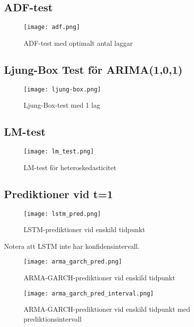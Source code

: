 \documentclass[11pt]{article}
\numberwithin{equation}{section}
\numberwithin{table}{section}
\numberwithin{figure}{section}
\begin{document}
\subsection{ADF-test}
\begin{figure}[H]
\caption{ADF-test med optimalt antal laggar}
\texttt{[image: adf.png]}
\centering
\end{figure}

\subsection{Ljung-Box Test för ARIMA(1,0,1)}
\begin{figure}[H]
\caption{Ljung-Box-test med 1 lag}
\texttt{[image: ljung-box.png]}
\centering
\end{figure}

\subsection{LM-test}
\begin{figure}[H]
\caption{LM-test för heteroskedasticitet}
\texttt{[image: lm\_test.png]}
\centering
\end{figure}

\subsection{Prediktioner vid t=1}
\begin{figure}[H]
\caption{LSTM-prediktioner vid enskild tidpunkt}
\texttt{[image: lstm\_pred.png]}
\centering
\end{figure}
Notera att LSTM inte har konfidensintervall.

\begin{figure}[H]
\caption{ARMA-GARCH-prediktioner vid enskild tidpunkt}
\texttt{[image: arma\_garch\_pred.png]}
\centering
\end{figure}

\begin{figure}[H]
\caption{ARMA-GARCH-prediktioner vid enskild tidpunkt med prediktionsintervall}
\texttt{[image: arma\_garch\_pred\_interval.png]}
\centering
\end{figure}
\end{document}
